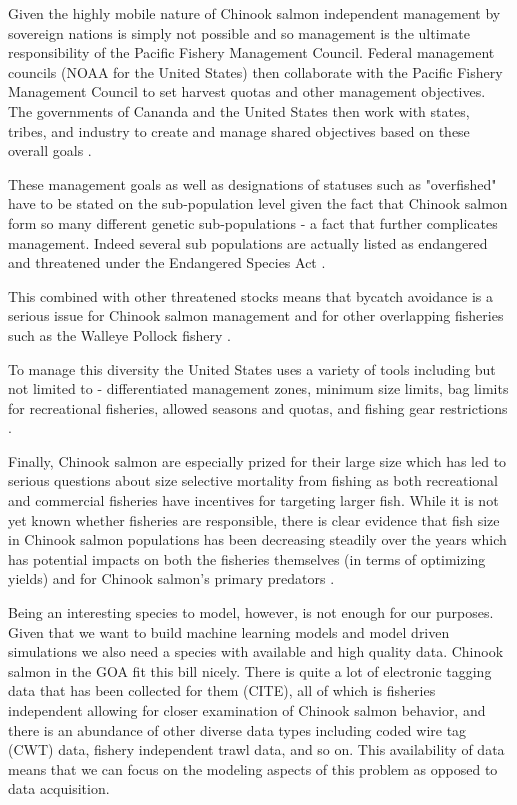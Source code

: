 \documentclass[11pt]{article}
\begin{document}
Given the highly mobile nature of Chinook salmon independent management by sovereign nations is simply not possible and so management is the ultimate responsibility of the Pacific Fishery Management Council. Federal management councils (NOAA for the United States) then collaborate with the Pacific Fishery Management Council to set harvest quotas and other management objectives. The governments of Cananda and the United States then work with states, tribes, and industry to create and manage shared objectives based on these overall goals \citep{NOAA22}. 

These management goals as well as designations of statuses such as "overfished" have to be stated on the sub-population level given the fact that Chinook salmon form so many different genetic sub-populations \citep{salmonplan} - a fact that further complicates management. Indeed several sub populations are actually listed as endangered and threatened under the Endangered Species Act \citep{NOAA24}.

This combined with other threatened stocks \citep{NOAA24} means that bycatch avoidance is a serious issue for Chinook salmon management and for other overlapping fisheries such as the Walleye Pollock fishery \citep{ianelli2015}. 

To manage this diversity the United States uses a variety of tools including but not limited to - differentiated management zones, minimum size limits, bag limits for recreational fisheries, allowed seasons and quotas, and fishing gear restrictions \citep{salmonplan}. \newline

Finally, Chinook salmon are especially prized for their large size which has led to serious questions about size selective mortality from fishing as both recreational and commercial fisheries have incentives for targeting larger fish. While it is not yet known whether fisheries are responsible, there is clear evidence that fish size in Chinook salmon populations has been decreasing steadily over the years which has potential impacts on both the fisheries themselves (in terms of optimizing yields) and for Chinook salmon's primary predators \citep{kendall2011}\citep{oceanchinook}. \newline

Being an interesting species to model, however, is not enough for our purposes. Given that we want to build machine learning models and model driven simulations we also need a species with available and high quality data. Chinook salmon in the GOA fit this bill nicely. There is quite a lot of electronic tagging data that has been collected for them (CITE), all of which is fisheries independent allowing for closer examination of Chinook salmon behavior, and there is an abundance of other diverse data types including coded wire tag (CWT) data, fishery independent trawl data, and so on. This availability of data means that we can focus on the modeling aspects of this problem as opposed to data acquisition. \newline
\end{document}
